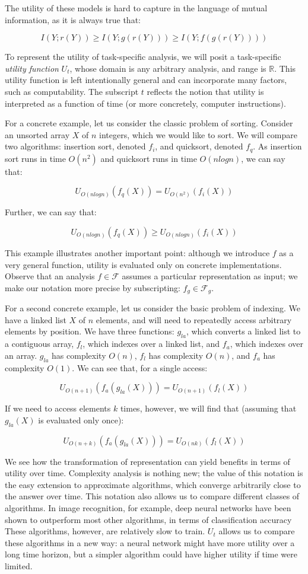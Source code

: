 The utility of these models is hard to capture in the language of mutual information, as it is always true that:

\[
I(Y; r(Y)) \geq I(Y; g(r(Y))) \geq I(Y; f(g(r(Y))))
\]

To represent the utility of task-specific analysis, we will posit a task-specific \textit{utility function} $U_t$, whose domain is any arbitrary analysis, and range is $\mathbb{R}$.
This utility function is left intentionally general and can incorporate many factors, such as computability.
The subscript $t$ reflects the notion that utility is interpreted as a function of time (or more concretely, computer instructions).

For a concrete example, let us consider the classic problem of sorting.
Consider an unsorted array $X$ of $n$ integers, which we would like to sort.
We will compare two algorithms: insertion sort, denoted $f_i$, and quicksort, denoted $f_q$.
As insertion sort runs in time $O(n^2)$ and quicksort runs in time $O(nlogn)$, we can say that:

\[
U_{O(nlogn)}(f_q(X)) = U_{O(n^2)}(f_i(X))
\]

Further, we can say that:

\[
U_{O(nlogn)}(f_q(X)) \geq U_{O(nlogn)}(f_i(X))
\]

This example illustrates another important point: although we introduce $f$ as a very general function, utility is evaluated only on concrete implementations.
Observe that an analysis $f \in \mathcal{F}$ assumes a particular representation as input; we make our notation more precise by subscripting: $f_g \in \mathcal{F}_g$.

For a second concrete example, let us consider the basic problem of indexing.
We have a linked list $X$ of $n$ elements, and will need to repeatedly access arbitrary elements by position.
We have three functions: $g_{la}$, which converts a linked list to a contiguous array, $f_l$, which indexes over a linked list, and $f_a$, which indexes over an array. $g_{la}$ has complexity $O(n)$, $f_l$ has complexity $O(n)$, and $f_a$ has complexity $O(1)$.
We can see that, for a single access:

\[
U_{O(n+1)}(f_a(g_{la}(X))) = U_{O(n+1)}(f_l(X))
\]

If we need to access elements $k$ times, however, we will find that (assuming that $g_{la}(X)$ is evaluated only once):

\[
U_{O(n+k)}(f_a(g_{la}(X))) = U_{O(nk)}(f_l(X))
\]

We see how the transformation of representation can yield benefits in terms of utility over time.
Complexity analysis is nothing new; the value of this notation is the easy extension to approximate algorithms, which converge arbitrarily close to the  answer over time.
This notation also allows us to compare different classes of algorithms.
In image recognition, for example, deep neural networks have been shown to outperform most other algorithms, in terms of classification accuracy
These algorithms, however, are relatively slow to train.
$U_t$ allows us to compare these algorithms in a new way: a neural network might have more utility over a long time horizon, but a simpler algorithm could have higher utility if time were limited.

